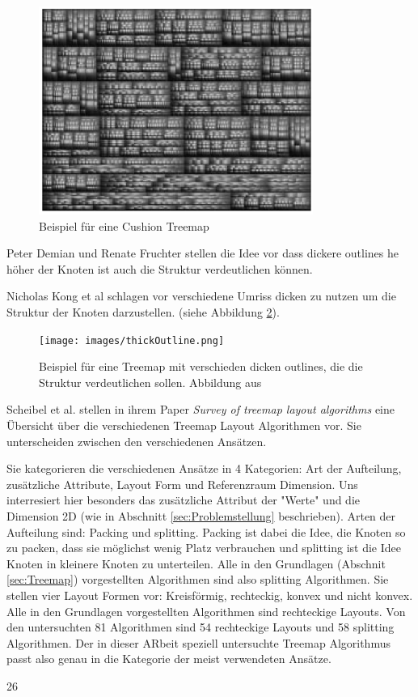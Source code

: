 \begin{figure}
    \centering
    \includegraphics[width=0.8\textwidth]{images/cushionTreemap.png}
    \caption{Beispiel für eine Cushion Treemap \cite[4]{cushionTreemaps}}
    \label{fig:cushion}
\end{figure}

Peter Demian und Renate Fruchter stellen die Idee vor dass dickere outlines he höher der Knoten ist auch die Struktur verdeutlichen können. 

Nicholas Kong et al schlagen vor verschiedene Umriss dicken zu nutzen um die Struktur der Knoten darzustellen.\cite{2010-perception-treemaps} (siehe Abbildung \ref{fig:thickOutline}).

\begin{figure}
    \centering
    \texttt{[image: images/thickOutline.png]}
    \caption{Beispiel für eine Treemap mit verschieden dicken outlines, die die Struktur verdeutlichen sollen. Abbildung aus \cite[1]{2010-perception-treemaps}}
    \label{fig:thickOutline}
\end{figure}

Scheibel et al. stellen in ihrem Paper \textit{Survey of treemap layout algorithms}\cite{scheibel2020survey} eine Übersicht über die verschiedenen Treemap Layout Algorithmen vor. Sie unterscheiden zwischen den verschiedenen Ansätzen. 

Sie kategorieren die verschiedenen Ansätze in 4 Kategorien: Art der Aufteilung, zusätzliche Attribute, Layout Form und Referenzraum Dimension. 
Uns interresiert hier besonders das zusätzliche Attribut der "Werte" und die Dimension 2D (wie in Abschnitt \ref{sec:Problemstellung} beschrieben).
Arten der Aufteilung sind: Packing und splitting. Packing ist dabei die Idee, die Knoten so zu packen, dass sie möglichst wenig Platz verbrauchen und splitting ist die Idee Knoten in kleinere Knoten zu unterteilen. Alle in den Grundlagen (Abschnit \ref{sec:Treemap}) vorgestellten Algorithmen sind also splitting Algorithmen.
Sie stellen vier Layout Formen vor: Kreisförmig, rechteckig, konvex und nicht konvex. Alle in den Grundlagen vorgestellten Algorithmen sind rechteckige Layouts.
Von den untersuchten 81 Algorithmen sind 54 rechteckige Layouts und 58 splitting Algorithmen. Der in dieser ARbeit speziell untersuchte Treemap Algorithmus passt also genau in die Kategorie der meist verwendeten Ansätze.

26